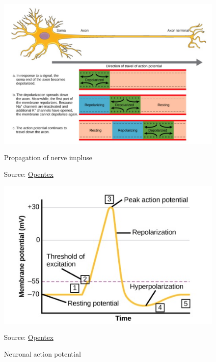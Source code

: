 \documentclass[12pt,a4paper]{report}
\begin{document}
\begin{figure}[H]
    \centering
    \begin{minipage}[b]{0.45\textwidth}
      \centering
      \includegraphics[width=\textwidth]{./data/propagation-of-nerve-impluse.jpg}
      \caption{Propagation of nerve impluse}
      \label{fig:exampleA}
      \vspace{1pt} %
      \small{Source: \href{https://opentextbc.ca/biology/chapter/16-2-how-neurons-communicate/}{Opentex}}
    \end{minipage}
    \hfill
    \begin{minipage}[b]{0.45\textwidth}
      \centering
      \includegraphics[width=\textwidth]{./data/neuronal-action-potential.jpg}
      \caption{Neuronal action potential}
      \label{fig:exampleB}
      \vspace{1pt} %
      \small{Source: \href{https://opentextbc.ca/biology/chapter/16-2-how-neurons-communicate/}{Opentex}}
    \end{minipage}
\end{figure}
\end{document}

